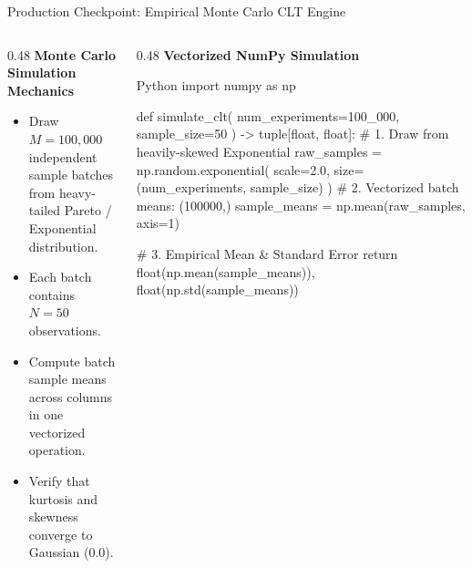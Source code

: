 \documentclass[../m00-session-03.tex]{subfiles}
\begin{document}
\begin{frame}[fragile]{Production Checkpoint: Empirical Monte Carlo CLT Engine}
  \begin{columns}[T,onlytextwidth]
    \begin{column}{0.48\textwidth}
      {\small\bfseries\color{UpGradNight}Monte Carlo Simulation Mechanics}\par\vspace{0.08cm}
      \begin{itemize}\setlength{\itemsep}{0.20em}\small
        \item Draw $M = 100,000$ independent sample batches from heavy-tailed Pareto / Exponential distribution.
        \item Each batch contains $N = 50$ observations.
        \item Compute batch sample means across columns in one vectorized operation.
        \item Verify that kurtosis and skewness converge to Gaussian ($0.0$).
      \end{itemize}
    \end{column}
    \hfill
    \begin{column}{0.48\textwidth}
      {\small\bfseries\color{UpGradRed}Vectorized NumPy Simulation}\par\vspace{0.06cm}
\begin{CodeBlock}{Python}
import numpy as np

def simulate_clt(
    num_experiments=100_000, 
    sample_size=50
) -> tuple[float, float]:
    # 1. Draw from heavily-skewed Exponential
    raw_samples = np.random.exponential(
        scale=2.0, 
        size=(num_experiments, sample_size)
    )
    # 2. Vectorized batch means: (100000,)
    sample_means = np.mean(raw_samples, axis=1)
    
    # 3. Empirical Mean & Standard Error
    return float(np.mean(sample_means)), float(np.std(sample_means))
\end{CodeBlock}
    \end{column}
  \end{columns}
\end{frame}
\end{document}
